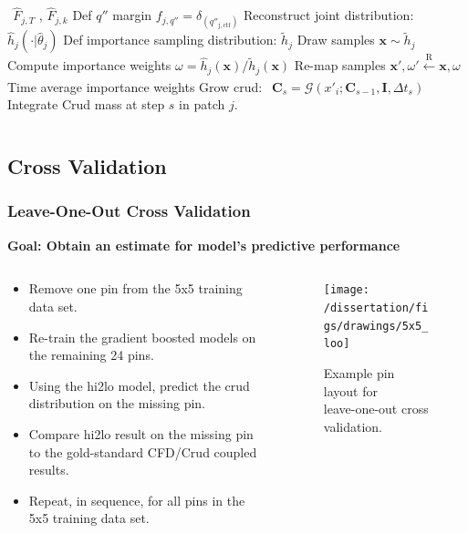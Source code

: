 \documentclass[t, pdftex]{beamer}
\begin{document}
\begin{frame}
\begin{columns}
\begin{column}{0.5\textwidth}
\begin{algorithm}[H]
\begin{algorithmic}[1]
				$\ \ \hat F_{j,T}$ , $\hat F_{j,k}$
				\STATE Def $q''$ margin  $f_{j,q''} = \delta_{(q''_\mathrm{j,ctf})}$
				\STATE Reconstruct joint distribution: $\hat h_j(\cdot |\hat \theta_j)$
				\ENDFOR
				\STATE Def importance sampling distribution: $\tilde h_j$
				\STATE Draw samples $\mathbf x \sim \tilde h_j$ \;
				\STATE Compute importance weights $\omega = \hat h_j(\mathbf x) /  \tilde h_j(\mathbf x) $
				\STATE Re-map samples  $\mathbf x', \omega' \xleftarrow[\text{ }]{\text{R}} \mathbf x, \omega $
				\STATE Time average importance weights
				\STATE Grow crud:
				$\ \ \mathbf C_s = \mathcal G(x'_i; \mathbf C_{s-1}, \mathbf I, \Delta t_s)$ \\
				\STATE Integrate Crud mass at step $s$ in patch $j$.
				\ENDFOR
				\ENDFOR
				\ENDFOR
			\end{algorithmic}
			\label{algo:hi2lo_crud_algo}
		\end{algorithm}
	\end{column}
\end{columns}
\end{frame}

\subsection*{Cross Validation}
\begin{frame}
\frametitle{Leave-One-Out Cross Validation}
\vspace{-8pt}
\textbf{Goal: Obtain an estimate for model's predictive performance}
\begin{columns}
    \begin{column}{0.5\textwidth}
        \small{
\begin{itemize}
    \item Remove one pin from the 5x5 training data set.
    \item Re-train the gradient boosted models on the remaining 24 pins.
    \item Using the hi2lo model, predict the crud distribution on the missing pin.
    \item Compare hi2lo result on the missing pin to the gold-standard CFD/Crud coupled results.
    \item Repeat, in sequence, for all pins in the 5x5 training data set.
\end{itemize}
}
    \end{column}
\begin{column}{0.5\textwidth}
 
\begin{figure}[h]
    \centering
    \texttt{[image: /dissertation/figs/drawings/5x5\_loo]}
    \caption{ \small Example pin layout for \\ leave-one-out cross validation.}
    \label{fig:5x5loo}
\end{figure}

\end{column}
\end{columns}
\end{frame}
\end{document}
